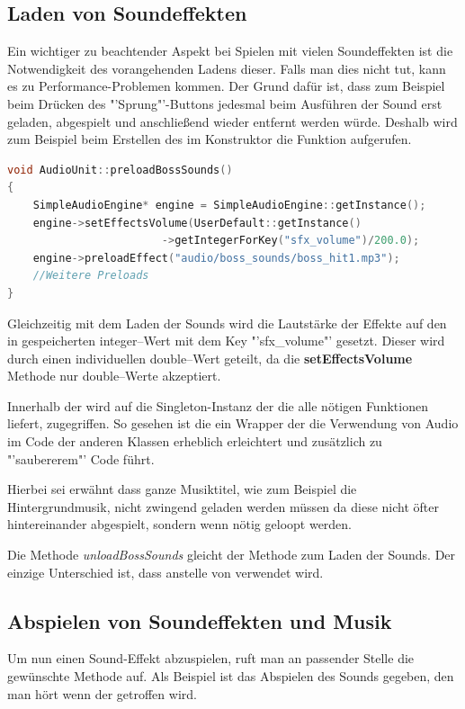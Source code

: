 \subsection{Laden von Soundeffekten}
Ein wichtiger zu beachtender Aspekt bei Spielen mit vielen Soundeffekten ist die Notwendigkeit des vorangehenden Ladens dieser. Falls man dies nicht tut, kann es zu Performance-Problemen kommen. Der Grund dafür ist, dass zum Beispiel beim Drücken des "'Sprung"'-Buttons jedesmal beim Ausführen der Sound erst geladen, abgespielt und anschließend wieder entfernt werden würde. Deshalb wird zum Beispiel beim Erstellen des  im Konstruktor die Funktion  aufgerufen.

\begin{lstlisting}[label=lst:preloadBossSounds,
				   language=C++,
				   firstnumber=30,
				   caption=BossLevel-Sounds laden ( AudioUnit.cpp )]
void AudioUnit::preloadBossSounds()
{
	SimpleAudioEngine* engine = SimpleAudioEngine::getInstance();
	engine->setEffectsVolume(UserDefault::getInstance()
						->getIntegerForKey("sfx_volume")/200.0);
	engine->preloadEffect("audio/boss_sounds/boss_hit1.mp3");
	//Weitere Preloads
}
\end{lstlisting}

Gleichzeitig mit dem Laden der Sounds wird die Lautstärke der Effekte auf den in  gespeicherten integer--Wert mit dem Key "'sfx\_volume"' gesetzt. Dieser wird durch einen individuellen double--Wert geteilt, da die \textbf{setEffectsVolume} Methode nur double--Werte akzeptiert.

Innerhalb der  wird auf die Singleton-Instanz der  die alle nötigen Funktionen liefert, zugegriffen. So gesehen ist die  ein Wrapper der die Verwendung von Audio im Code der anderen Klassen erheblich erleichtert und zusätzlich zu "'saubererem"' Code führt. 

Hierbei sei erwähnt dass ganze Musiktitel, wie zum Beispiel die Hintergrundmusik, nicht zwingend geladen werden müssen da diese nicht öfter hintereinander abgespielt, sondern wenn nötig geloopt werden. 

Die Methode \textit{unloadBossSounds} gleicht der Methode zum Laden der Sounds. Der einzige Unterschied ist, dass  anstelle von  verwendet wird.

\subsection{Abspielen von Soundeffekten und Musik} 
Um nun einen Sound-Effekt abzuspielen, ruft man an passender Stelle die gewünschte Methode auf. Als Beispiel ist das Abspielen des Sounds gegeben, den man hört wenn der  getroffen wird.

